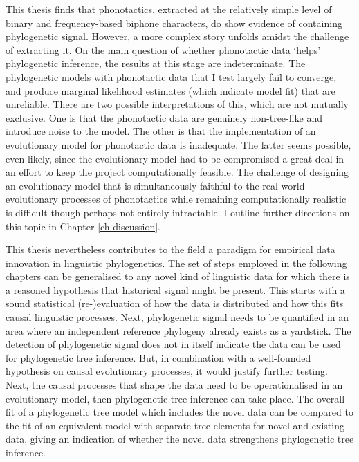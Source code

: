 This thesis finds that phonotactics, extracted at the relatively simple level of binary and frequency-based biphone characters, do show evidence of containing phylogenetic signal. However, a more complex story unfolds amidst the challenge of extracting it. On the main question of whether phonotactic data `helps' phylogenetic inference, the results at this stage are indeterminate. The phylogenetic models with phonotactic data that I test largely fail to converge, and produce marginal likelihood estimates (which indicate model fit) that are unreliable. There are two possible interpretations of this, which are not mutually exclusive. One is that the phonotactic data are genuinely non-tree-like and introduce noise to the model. The other is that the implementation of an evolutionary model for phonotactic data is inadequate. The latter seems possible, even likely, since the evolutionary model had to be compromised a great deal in an effort to keep the project computationally feasible. The challenge of designing an evolutionary model that is simultaneously faithful to the real-world evolutionary processes of phonotactics while remaining computationally realistic is difficult though perhaps not entirely intractable. I outline further directions on this topic in Chapter \ref{ch-discussion}.

This thesis nevertheless contributes to the field a paradigm for empirical data innovation in linguistic phylogenetics. The set of steps employed in the following chapters can be generalised to any novel kind of linguistic data for which there is a reasoned hypothesis that historical signal might be present. This starts with a sound statistical (re-)evaluation of how the data is distributed and how this fits causal linguistic processes. Next, phylogenetic signal needs to be quantified in an area where an independent reference phylogeny already exists as a yardstick. The detection of phylogenetic signal does not in itself indicate the data can be used for phylogenetic tree inference. But, in combination with a well-founded hypothesis on causal evolutionary processes, it would justify further testing. Next, the causal processes that shape the data need to be operationalised in an evolutionary model, then phylogenetic tree inference can take place. The overall fit of a phylogenetic tree model which includes the novel data can be compared to the fit of an equivalent model with separate tree elements for novel and existing data, giving an indication of whether the novel data strengthens phylogenetic tree inference.


